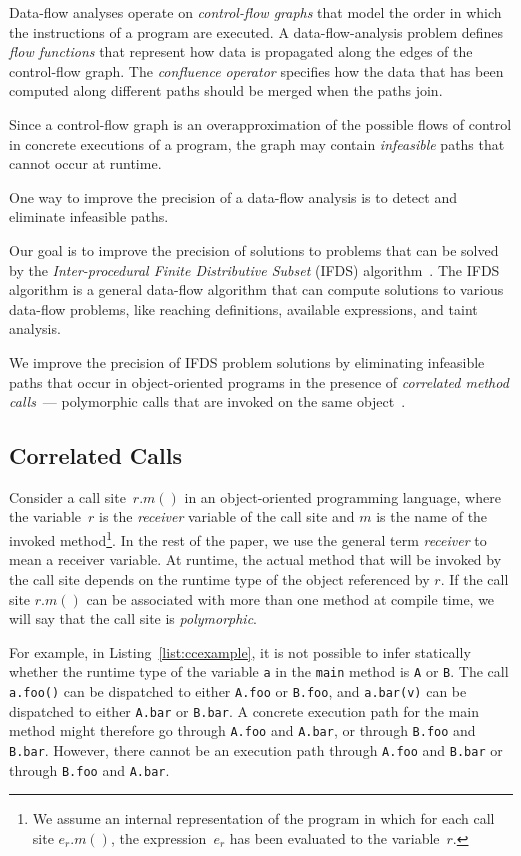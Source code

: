 Data-flow analyses operate on \textit{control-flow graphs} that model the order in which the instructions of a program are executed.
A data-flow-analysis problem defines \textit{flow functions} that represent how data is propagated along the edges of the control-flow graph. The \textit{confluence operator} specifies how the data that has been computed along different paths should be merged when the paths join.

Since a control-flow graph is an overapproximation of the possible flows of control in concrete executions of a program, the graph may contain \textit{infeasible} paths that cannot occur at runtime.

One way to improve the precision of a data-flow analysis is to detect and eliminate infeasible paths.

Our goal is to improve the precision of solutions to problems that can be solved by the \textit{Inter-procedural Finite Distributive Subset} (IFDS) algorithm~\cite{reps1995precise}.
The IFDS algorithm is a general data-flow algorithm that can compute solutions to various data-flow problems, like reaching definitions, available expressions, and taint analysis.

We improve the precision of IFDS problem solutions by eliminating infeasible paths that occur in object-oriented programs in the presence of \textit{correlated method calls}~--- polymorphic calls that are invoked on the same object~\cite{DBLP:journals/scp/Tip15}.

\subsection{Correlated Calls}

Consider a call site~$r.m()$ in an object-oriented programming language, where the variable~$r$ is the \textit{receiver} variable of the call site and $m$ is the name of the invoked method\footnote{We assume an internal representation of the program in which for each call site $e_r.m()$, the expression~$e_r$ has been evaluated to the variable~$r$.}. In the rest of the paper, we use the general term \textit{receiver} to mean a receiver variable.
At runtime, the actual method that will be invoked by the call site depends on the runtime type of the object referenced by $r$. If the call site $r.m()$ can be associated with more than one method at compile time, we will say that the call site is \textit{polymorphic}.

For example, in Listing~\ref{list:ccexample}, it is not possible to infer statically whether the runtime type of the variable \verb'a' in the \texttt{main} method is \verb'A' or \verb'B'.
The call \verb'a.foo()' can be dispatched to either \verb'A.foo' or \verb'B.foo', and \verb'a.bar(v)' can be dispatched to either \verb'A.bar' or \verb'B.bar'.
A concrete execution path for the main method might therefore go through \verb'A.foo' and \verb'A.bar', or through \verb'B.foo' and \verb'B.bar'.
However, there cannot be an execution path through \verb'A.foo' and \verb'B.bar' or through \verb'B.foo' and \verb'A.bar'.

